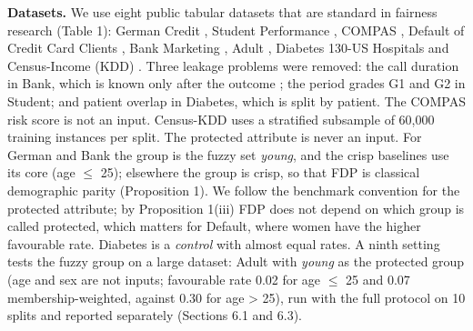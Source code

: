 \documentclass[pdflatex,sn-basic,Numbered,lineno]{sn-jnl}
\begin{document}
\textbf{Datasets.} We use eight public tabular datasets that are standard in fairness research \cite{lequy} (Table 1): German Credit \cite{german}, Student Performance \cite{student}, COMPAS \cite{compas}, Default of Credit Card Clients \cite{default}, Bank Marketing \cite{bank}, Adult \cite{adult}, Diabetes 130-US Hospitals \cite{diabetes} and Census-Income (KDD) \cite{censuskdd}. Three leakage problems were removed: the call duration in Bank, which is known only after the outcome \cite{bank}; the period grades G1 and G2 in Student; and patient overlap in Diabetes, which is split by patient. The COMPAS risk score is not an input. Census-KDD uses a stratified subsample of 60,000 training instances per split. The protected attribute is never an input. For German and Bank the group is the fuzzy set \emph{young}, and the crisp baselines use its core (age \ensuremath{\le} 25); elsewhere the group is crisp, so that FDP is classical demographic parity (Proposition 1). We follow the benchmark convention \cite{lequy} for the protected attribute; by Proposition 1(iii) FDP does not depend on which group is called protected, which matters for Default, where women have the higher favourable rate. Diabetes is a \emph{control} with almost equal rates. A ninth setting tests the fuzzy group on a large dataset: Adult with \emph{young} as the protected group (age and sex are not inputs; favourable rate 0.02 for age \ensuremath{\le} 25 and 0.07 membership-weighted, against 0.30 for age \textgreater{} 25), run with the full protocol on 10 splits and reported separately (Sections 6.1 and 6.3).
\end{document}
